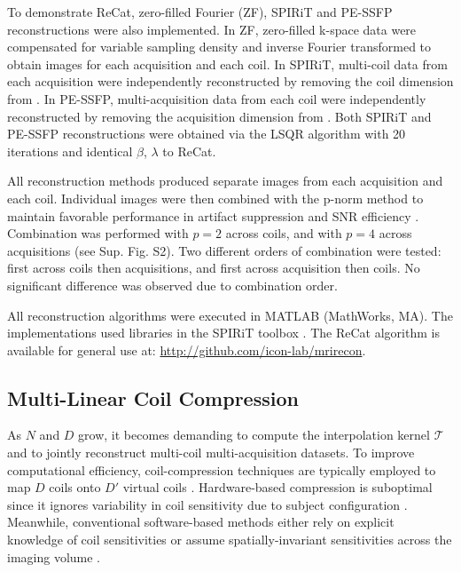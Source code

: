 \documentclass[11pt, onecolumn]{article}
\begin{document}
To demonstrate ReCat, zero-filled Fourier (ZF), SPIRiT \cite{Lustig:2010hs} and PE-SSFP \cite{Ilicak:FJpKoYYb} reconstructions were also implemented. In ZF, zero-filled k-space data were compensated for variable sampling density and inverse Fourier transformed to obtain images for each acquisition and each coil. In SPIRiT, multi-coil data from each acquisition were independently reconstructed by removing the coil dimension from . In PE-SSFP, multi-acquisition data from each coil were independently reconstructed by removing the acquisition dimension from . Both SPIRiT and PE-SSFP reconstructions were obtained via the LSQR algorithm with 20 iterations and identical $\beta$, $\lambda$ to ReCat.

All reconstruction methods produced separate images from each acquisition and each coil. Individual images were then combined with the p-norm method to maintain favorable performance in artifact suppression and SNR efficiency \cite{PNORM}. Combination was performed with $p=2$ across coils, and with $p=4$ across acquisitions (see Sup. Fig. S2). Two different orders of combination were tested: first across coils then acquisitions, and first across acquisition then coils. No significant difference was observed due to combination order.

All reconstruction algorithms were executed in MATLAB (MathWorks, MA). The implementations used libraries in the SPIRiT toolbox \cite{Lustig:2010hs}. The ReCat algorithm is available for general use at: \url{http://github.com/icon-lab/mrirecon}.

\subsection*{Multi-Linear Coil Compression}
As $N$ and $D$ grow, it becomes demanding to compute the interpolation kernel $\mathcal{T}$ and to jointly reconstruct multi-coil multi-acquisition datasets. To improve computational efficiency, coil-compression techniques are typically employed to map $D$ coils onto $D'$ virtual coils \cite{buehrer2007array,huang2008software,king2010optimum,Zhang:2013df}. Hardware-based compression is suboptimal since it ignores variability in coil sensitivity due to subject configuration \cite{king2010optimum}. Meanwhile, conventional software-based methods either rely on explicit knowledge of coil sensitivities  \cite{buehrer2007array} or assume spatially-invariant sensitivities across the imaging volume \cite{huang2008software}. 
\end{document}
